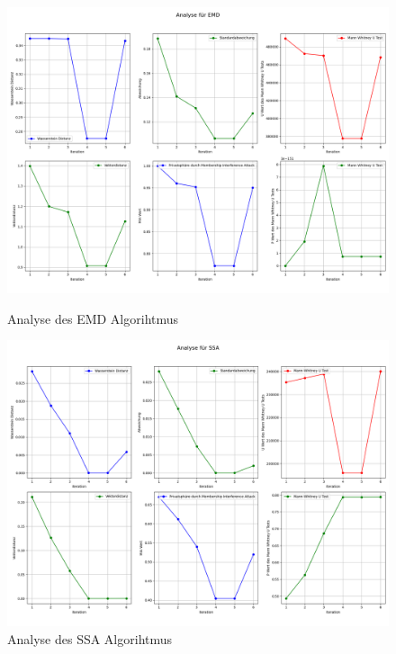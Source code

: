 \begin{figure}[ht]
    \centering
    \begin{minipage}{0.5\textwidth}
        \centering
        \includegraphics[width=\textwidth]{includes/figures/graphs/emd_analysis.png}
        \caption{Analyse des EMD Algorihtmus}
        \label{fig:graphs_emd_analysis}
    \end{minipage}\hfill
    \begin{minipage}{0.5\textwidth}
        \centering
        \includegraphics[width=\textwidth]{includes/figures/graphs/SSA_analysis.png}
        \caption{Analyse des SSA Algorihtmus}
        \label{fig:graphs_ssa_analysis}
    \end{minipage}
\end{figure}

